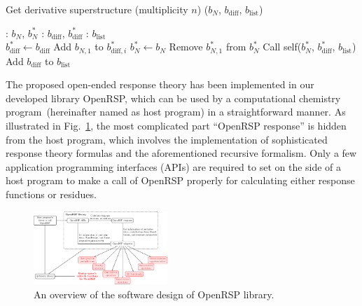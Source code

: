 \documentclass[%
 reprint,
 amsmath,amssymb,
 aps,
]{revtex4-1}
\begin{document}

\begin{algorithm}
\caption{Get derivative superstructure (multiplicity $n$) ($b_{N}$, $b_{\text{diff}}$, $b_{\text{list}}$)}
\label{GET-DS}
\begin{algorithmic}
: $b_{N}$, $b_{N}^{*}$
: $b_{\text{diff}}$, $b_{\text{diff}}^{*}$
: $b_{\text{list}}$\\

         \State $b_{\text{diff}}^{*} \gets b_{\text{diff}}$
         \State Add $b_{N, 1}$ to $b_{\text{diff}, i}^{*}$
         \State $b_{N}^{*} \gets b_{N}$
         \State Remove $b_{N, 1}^{*}$ from $b_{N}^{*}$ 
         \State Call self($b_{N}^{*}$, $b_{\text{diff}}^{*}$, $b_{\text{list}}$) %
      \EndFor
   \Else
            \State Add $b_{\text{diff}}$ to $b_{\text{list}}$
         \EndIf
      \EndIf
   \EndIf
\end{algorithmic}
\end{algorithm}


The proposed open-ended response theory has been implemented in our developed
library OpenRSP, which can be used by a computational chemistry
program~(hereinafter named as host program) in a straightforward manner. As
illustrated in Fig.~\ref{fig-openrsp-design}, the most complicated part
``OpenRSP response'' is hidden from the host program, which involves the
implementation of sophisticated response theory formulas and the aforementioned
recursive formalism. Only a few application programming interfaces (APIs) are
required to set on the side of a host program to make a call of OpenRSP
properly for calculating either response functions or residues.

\begin{figure}[hbt]
  \centering
  \includegraphics[width=0.45\textwidth]{openrsp_design.pdf}
  \caption{An overview of the software design of OpenRSP library.}
  \label{fig-openrsp-design}
\end{figure}
\end{document}
